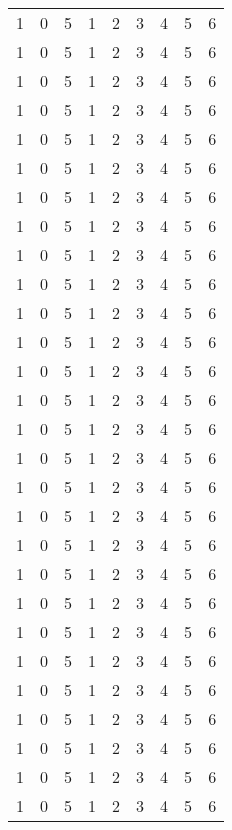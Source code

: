 {\begin{longtable}{ccccccccc}
  1     & 0 & 5  & 1  & 2  & 3  & 4  &  5 & 6 \\
  1     & 0 & 5  & 1  & 2  & 3  & 4  &  5 & 6 \\
  1     & 0 & 5  & 1  & 2  & 3  & 4  &  5 & 6 \\
  1     & 0 & 5  & 1  & 2  & 3  & 4  &  5 & 6 \\
  1     & 0 & 5  & 1  & 2  & 3  & 4  &  5 & 6 \\
  1     & 0 & 5  & 1  & 2  & 3  & 4  &  5 & 6 \\
  1     & 0 & 5  & 1  & 2  & 3  & 4  &  5 & 6 \\
  1     & 0 & 5  & 1  & 2  & 3  & 4  &  5 & 6 \\
  1     & 0 & 5  & 1  & 2  & 3  & 4  &  5 & 6 \\
  1     & 0 & 5  & 1  & 2  & 3  & 4  &  5 & 6 \\
  1     & 0 & 5  & 1  & 2  & 3  & 4  &  5 & 6 \\
  1     & 0 & 5  & 1  & 2  & 3  & 4  &  5 & 6 \\
  1     & 0 & 5  & 1  & 2  & 3  & 4  &  5 & 6 \\
  1     & 0 & 5  & 1  & 2  & 3  & 4  &  5 & 6 \\
  1     & 0 & 5  & 1  & 2  & 3  & 4  &  5 & 6 \\
  1     & 0 & 5  & 1  & 2  & 3  & 4  &  5 & 6 \\
  1     & 0 & 5  & 1  & 2  & 3  & 4  &  5 & 6 \\
  1     & 0 & 5  & 1  & 2  & 3  & 4  &  5 & 6 \\
  1     & 0 & 5  & 1  & 2  & 3  & 4  &  5 & 6 \\
  1     & 0 & 5  & 1  & 2  & 3  & 4  &  5 & 6 \\
  1     & 0 & 5  & 1  & 2  & 3  & 4  &  5 & 6 \\
  1     & 0 & 5  & 1  & 2  & 3  & 4  &  5 & 6 \\
  1     & 0 & 5  & 1  & 2  & 3  & 4  &  5 & 6 \\
  1     & 0 & 5  & 1  & 2  & 3  & 4  &  5 & 6 \\
  1     & 0 & 5  & 1  & 2  & 3  & 4  &  5 & 6 \\
  1     & 0 & 5  & 1  & 2  & 3  & 4  &  5 & 6 \\
  1     & 0 & 5  & 1  & 2  & 3  & 4  &  5 & 6 \\
  1     & 0 & 5  & 1  & 2  & 3  & 4  &  5 & 6 \\

  \end{longtable}
}

